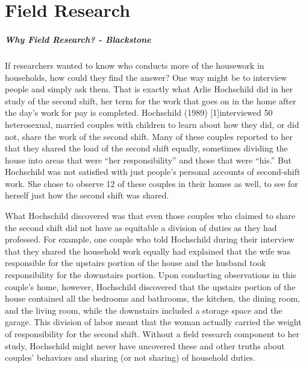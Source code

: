 \chapter{Field Research}\label{ch11:field_research}

\paragraph{Why Field Research? - Blackstone}

If researchers wanted to know who conducts more of the housework in households, how could they find the answer? One way might be to interview people and simply ask them. That is exactly what Arlie Hochschild did in her study of the second shift, her term for the work that goes on in the home after the day’s work for pay is completed. Hochschild (1989) [1]interviewed 50 heterosexual, married couples with children to learn about how they did, or did not, share the work of the second shift. Many of these couples reported to her that they shared the load of the second shift equally, sometimes dividing the house into areas that were ``her responsibility'' and those that were ``his.'' But Hochschild was not satisfied with just people's personal accounts of second-shift work. She chose to observe 12 of these couples in their homes as well, to see for herself just how the second shift was shared.

What Hochschild discovered was that even those couples who claimed to share the second shift did not have as equitable a division of duties as they had professed. For example, one couple who told Hochschild during their interview that they shared the household work equally had explained that the wife was responsible for the upstairs portion of the house and the husband took responsibility for the downstairs portion. Upon conducting observations in this couple's home, however, Hochschild discovered that the upstairs portion of the house contained all the bedrooms and bathrooms, the kitchen, the dining room, and the living room, while the downstairs included a storage space and the garage. This division of labor meant that the woman actually carried the weight of responsibility for the second shift. Without a field research component to her study, Hochschild might never have uncovered these and other truths about couples' behaviors and sharing (or not sharing) of household duties.

